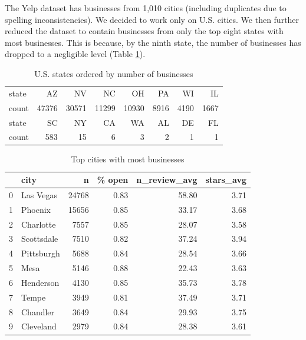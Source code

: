 \documentclass[compsoc]{IEEEtran}
\let\MYoriglatexcaption\caption
\renewcommand{\caption}[2][\relax]{\MYoriglatexcaption[#2]{#2}}
\begin{document}
The Yelp dataset has businesses from 1,010 cities (including duplicates due to spelling inconsistencies). We decided to work only on U.S. cities. We then further reduced the dataset to contain businesses from only the top eight states with most businesses. This is because, by the ninth state, the number of businesses has dropped to a negligible level (Table \ref{top-states}).

\begin{table}[htbp]
\caption{U.S. states ordered by number of businesses}
\label{top-states}
\bgroup
\def\arraystretch{1.3}
\begin{tabular}{l|rrrrrrr}
\toprule
{state} &     AZ &     NV &     NC &     OH &    PA &    WI &    IL \\
count &  47376 &  30571 &  11299 &  10930 &  8916 &  4190 &  1667 \\

\hline

{state} &   SC &  NY &  CA &  WA &  AL &  DE &  FL \\

count &  583 &  15 &   6 &   3 &   2 &   1 &   1 \\
\bottomrule
\end{tabular}
\egroup
\end{table}

\begin{table}[htbp]
\caption{Top cities with most businesses}
\label{city-biz-table}
\centering
\begin{tabular}{llrrrr}
\toprule
{} &        city &      n &  \% open &  n\_review\_avg &  stars\_avg \\
\midrule
0 &   Las Vegas &  24768 &    0.83 &         58.80 &       3.71 \\
1 &     Phoenix &  15656 &    0.85 &         33.17 &       3.68 \\
2 &   Charlotte &   7557 &    0.85 &         28.07 &       3.58 \\
3 &  Scottsdale &   7510 &    0.82 &         37.24 &       3.94 \\
4 &  Pittsburgh &   5688 &    0.84 &         28.54 &       3.66 \\
5 &        Mesa &   5146 &    0.88 &         22.43 &       3.63 \\
6 &   Henderson &   4130 &    0.85 &         35.73 &       3.78 \\
7 &       Tempe &   3949 &    0.81 &         37.49 &       3.71 \\
8 &    Chandler &   3649 &    0.84 &         29.93 &       3.75 \\
9 &   Cleveland &   2979 &    0.84 &         28.38 &       3.61 \\
\bottomrule
\end{tabular}
\end{table}
\end{document}
